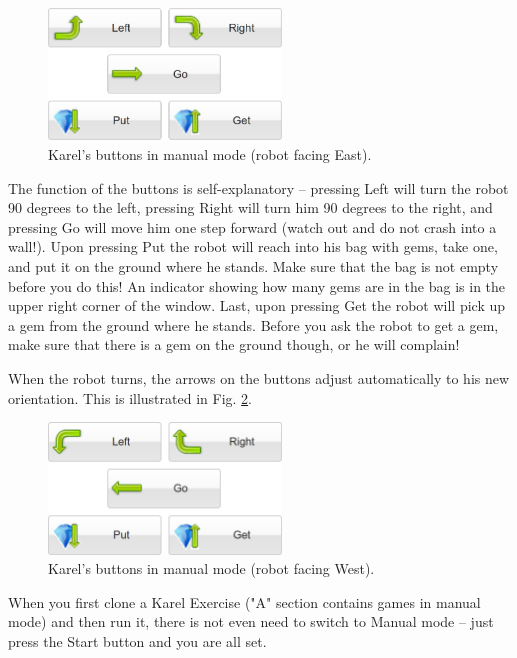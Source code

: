 \begin{figure}[!ht]
\begin{center}
\includegraphics[width=6.2cm]{imgk/buttons-all.png}
\vspace{-0mm}
\caption{Karel's buttons in manual mode (robot facing East).}
\label{fig:buttons}
\end{center}
\end{figure}
\noindent
The function of the buttons is self-explanatory -- pressing Left will turn the robot 90 degrees to the left,
pressing Right will turn him 90 degrees to the right, and pressing Go will move him one step forward 
(watch out and do not crash into a wall!). Upon pressing Put the robot will reach into his bag with gems, 
take one, and put it on the ground where he stands. Make sure that the bag is not empty before you do this!
An indicator showing how many gems are in the bag is in the upper right corner of the window. Last, upon pressing 
Get the robot will pick up a gem from the ground where he stands. Before you ask the robot to get a gem,
make sure that there is a gem on the ground though, or he will complain!

When the robot turns, the arrows on the buttons adjust automatically to his new 
orientation. This is illustrated in Fig. \ref{fig:buttons2}.
\begin{figure}[!ht]
\begin{center}
\includegraphics[width=6.2cm]{imgk/buttons-all-2.png}
\vspace{-0mm}
\caption{Karel's buttons in manual mode (robot facing West).}
\label{fig:buttons2}
\end{center}
\end{figure}

\noindent
When you first clone a Karel Exercise ("A" section contains 
games in manual mode) and then 
run it, there is not even need to switch to Manual mode -- just press the Start button and you are 
all set.

